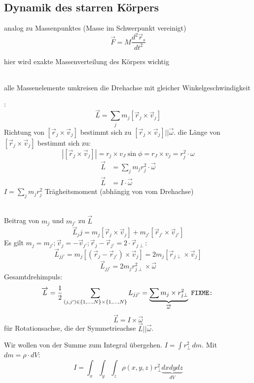 \documentclass[a4paper,10pt]{scrartcl}
\begin{document}
\subsection{Dynamik des starren Körpers}
\begin{sg}[Translation]
 analog zu Massenpunktes (Masse im Schwerpunkt vereinigt)
\[
 \vec F= M \frac{d^2\vec r_s}{dt^2}
\]
\end{sg}
\begin{sg}[Rotation]
 hier wird exakte Massenverteilung des Körpers wichtig
\end{sg}
\begin{sg}
 \\
alle Massenelemente umkreisen die Drehachse mit gleicher Winkelgeschwindigkeit
\end{sg}
\begin{sg}
 :
\[
 \vec L= \sum_j m_j[\vec r_j \times \vec v_j]
\]
Richtung von $[\vec r_j \times \vec v_j]$ bestimmt sich zu $[\vec r_j \times \vec v_j]||\vec \omega$. die Länge von $[\vec r_j \times \vec v_j]$ bestimmt sich zu: 
\[
 |[\vec r_j \times \vec v_j]|=r_j\times v_J \sin\phi = r_J \times v_j  = r_j^2 \cdot \omega
\]
\begin{align*}
 \vec L&= \sum_j m_j r_j^2 \cdot \vec \omega\\
 \vec L&= I\cdot \vec \omega
\end{align*}
$I=\sum_j m_j r_j^2$ Trägheitsmoment (abhängig von vom Drehachse) 
\end{sg}
\begin{sg}
\\
Beitrag von $m_j$ und $m_{j'}$ zu $\vec L$
\[
 \vec L_jj=m_j[\vec r_j \times \vec v_j]+ m_{j'}[\vec r_{j'}\times \vec v_{j'}]
\]
Es gilt $m_j=m_{j'};  \vec v_j=- \vec v_{j'}; \vec r_j-\vec r_{j'}=2\cdot \vec r_{j\perp}$:
\[
 \vec L_{jj'}=m_j[(\vec r_j-\vec r_{j'})\times \vec v_j]= 2 m_j[\vec r_{j\perp}\times \vec v_j]
\]
\[
 \vec L_{jj'}=2m_j r_{j\perp}^2\times \vec \omega
\]
Gesamtdrehimpuls:
\[
 \overrightarrow{L}= \frac{1}{2} \sum_{(j,j')\in \{1,...,N\}\times\{1,...,N\}} L_{jj'}=
\underbrace{\sum m_j \times r_{j\perp}^2}_{ \overrightarrow{\omega}} \;\texttt{FIXME:} \; 
 \]
\[
 \vec L=I\times \vec \omega
\]
für Rotationsachse, die der Symmetrieachse $\vec L || \vec \omega$.
\end{sg}
\begin{sg}
 Wir wollen von der Summe zum Integral übergehen. $I=\int r_\perp^2 \, dm$. Mit $dm=\rho \cdot dV$:
\[
 I=\int_x\int_y\int_z \rho(x,y,z) r_\perp^2 \underbrace{dx dy dz}_{dV}
\] 
\end{sg}
\end{document}
